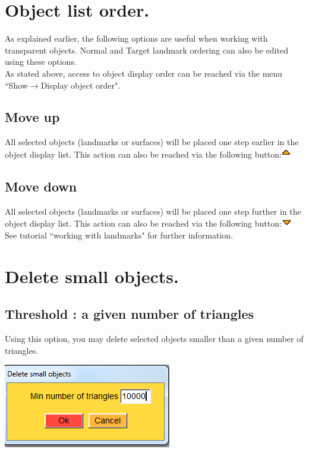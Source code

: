 \section{Object list order.}
As explained earlier, the following options are useful when working with transparent objects. Normal and Target landmark ordering can also be edited using these options.
\\As stated above, access to object display order can be reached via the menu ``Show$\rightarrow$Display object order".

\subsection{Move up}
All selected objects (landmarks or surfaces) will be placed one step earlier in the object display list.
This action can also be reached via the following button:\includegraphics[scale=0.7]{images/pixmap/s_dessous_17.png}

\subsection{Move down}
All selected objects (landmarks or surfaces) will be placed one step further in the object display list.
This action can also be reached via the following button:\includegraphics[scale=0.7]{images/pixmap/s_dessus_17.png}
See tutorial ``working with landmarks" for further information.


\section{Delete small objects.}

\subsection{Threshold : a given number of triangles}
\noindent
\begin{minipage}{0.5\textwidth}
Using this option, you may delete selected objects smaller than a given number of triangles.
\end{minipage}    
\begin{minipage}{0.5\textwidth}\centering
  \includegraphics[scale=0.5]{images/Edit_selected_objects/Delete_small_1.png}
 \end{minipage} 
\noindent




